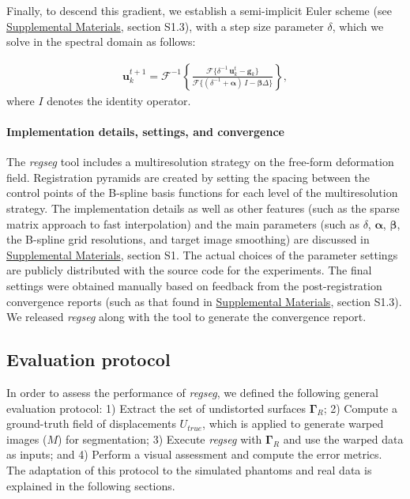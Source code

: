 \documentclass[3p,authoryear,fleqn]{elsarticle}
\providecommand{\gammaset}{\ensuremath{\boldsymbol{\Gamma}}}
\providecommand{\regseg}{\emph{regseg}}
\renewcommand{\vec}[1]{\mathbf{#1}}
\providecommand{\suppl}[1]{\href{http://figshare.com/s/459c26b4ee8211e493b306ec4bbcf141}{Supplemental Materials}, #1}
\begin{document}
Finally, to descend this gradient, we establish a semi-implicit Euler scheme (see \suppl{section S1.3}),
  with a step size parameter $\delta$, which we solve in the spectral domain as follows:

  \begin{align}
  \vec{u}_k^{t+1} = \mathcal{F}^{-1}\left\{ \frac{\mathcal{F}\{\delta^{-1} \, \vec{u}_k^t - \vec{g}_k\} }                  {\mathcal{F}\{(\delta^{-1} + \boldsymbol{\alpha})\, I - \boldsymbol{\beta}\Delta\}} \right\},
  \label{eq:update_equation}
  \end{align}
  where $I$ denotes the identity operator.


\paragraph*{Implementation details, settings, and convergence}
\label{sec:conv_report}
The \regseg{} tool includes a multiresolution strategy on the free-form deformation field.
Registration pyramids are created by setting the spacing between the control points of the B-spline basis
  functions for each level of the multiresolution strategy.
The implementation details as well as other features (such as the sparse matrix approach
  to fast interpolation) and the main parameters 
  (such as $\delta$, $\boldsymbol{\alpha}$, $\boldsymbol{\beta}$, the B-spline grid resolutions,
 and target image smoothing) are discussed in \suppl{section S1}.
The actual choices of the parameter settings are publicly distributed with the source code for the experiments.
The final settings were obtained manually based on feedback from the post-registration convergence
  reports (such as that found in \suppl{section S1.3}).
We released \regseg{} along with the tool to generate the convergence report.

\subsection{Evaluation protocol}\label{sec:evaluation_protocol}
In order to assess the performance of \regseg{}, we defined the following general
  evaluation protocol:
1) Extract the set of undistorted surfaces $\gammaset_R$;
2) Compute a ground-truth field of displacements $U_{true}$, which is applied to
  generate warped images ($M$) for segmentation;
3) Execute \regseg{} with $\gammaset_R$ and use the warped data as inputs; and
4) Perform a visual assessment and compute the error metrics.
The adaptation of this protocol to the simulated phantoms and real data is explained in the
  following sections.
\end{document}
